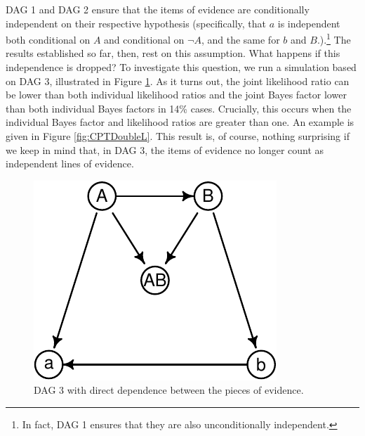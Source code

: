 \documentclass[
  10pt,
  dvipsnames,enabledeprecatedfontcommands]{scrartcl}
\newcommand{\n}{\neg}
\begin{document}
\textsf{DAG 1} and \textsf{DAG 2} ensure that the items of evidence are
conditionally independent on their respective hypothesis (specifically,
that \(a\) is independent both conditional on \(A\) and conditional on
\(\n A\), and the same for \(b\) and \(B\).).\footnote{In fact,
  \textsf{DAG 1} ensures that they are also unconditionally independent.}
The results established so far, then, rest on this assumption. What
happens if this independence is dropped? To investigate this question,
we run a simulation based on \textsf{DAG 3}, illustrated in Figure
\ref{fig:dag3}. As it turns out, the joint likelihood ratio can be lower
than both individual likelihood ratios and the joint Bayes factor lower
than both individual Bayes factors in 14\% cases. Crucially, this occurs
when the individual Bayes factor and likelihood ratios are greater than
one. An example is given in Figure \ref{fig:CPTDoubleL}. This result is,
of course, nothing surprising if we keep in mind that, in
\textsf{DAG 3}, the items of evidence no longer count as independent
lines of evidence.

\vspace{1mm}
\footnotesize

\normalsize

\begin{figure}[H]


\begin{center}\includegraphics[width=0.7\linewidth]{conjunction-appendix14_files/figure-latex/unnamed-chunk-27-1} \end{center}
\caption{\textsf{DAG 3} with direct dependence between the pieces of evidence.}
\label{fig:dag3}
\end{figure}
\end{document}
